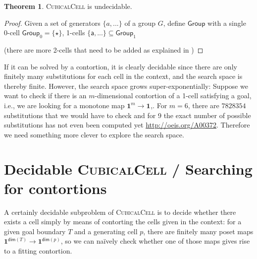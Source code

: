 \documentclass[11pt]{article}
\theoremstyle{definition}
\newtheorem{theorem}{Theorem}
\newcommand{\problem}[1]{\textsc{{#1}}}
\newcommand{\pint}[1]{\mathbf{1}^{#1}}
\renewcommand{\dim}[1]{\mathsf{dim}({#1})}
\newcommand{\smap}[1]{s^{{#1}}}
\newcommand{\dmap}[2]{d^{({#1} , {#2})}}
\newcommand{\cset}[1]{\mathsf{{#1}}}
\begin{document}
\begin{theorem}
  \problem{CubicalCell} is undecidable.
  \begin{proof}


    Given a set of generators $\{a, ...\}$ of a group $G$, define $\cset{Group}$
    with a single 0-cell $\cset{Group}_0 = \{ \cset{\star} \}$, 
    1-cells $\{\cset{a} , ... \} \subseteq \cset{Group}_1$ 

    (there are more 2-cells that need to be added as explained in \cite[Sect. 6.3]{bezem14_model_type_theor_cubic_sets})

\end{proof}
\end{theorem}

If it can be solved by a contortion, it is clearly decidable since there are
only finitely many substitutions for each cell in the context, and the search
space is thereby finite. However, the search space grows super-exponentially:
Suppose we want to check if there is an $m$-dimensional contortion of a 1-cell
satisfying a goal, i.e., we are looking for a monotone map $\pint{m} \to
\pint{}$,. For $m = 6$, there are $7828354$ substitutions that we would have to
check and for 9 the exact number of possible substitutions has not even been
computed yet \url{http://oeis.org/A00372}. Therefore we need something more
clever to explore the search space.



\section{Decidable \problem{CubicalCell} / Searching for contortions}

A certainly decidable subproblem of \problem{CubicalCell} is to decide whether
there exists a cell simply by means of contorting the cells given in the
context: for a given goal boundary $T$ and a generating cell $p$, there are
finitely many poset maps $\pint{\dim{T}} \to \pint{\dim{p}}$, so we can
na\"ively check whether one of those maps gives rise to a fitting contortion. 
\end{document}
